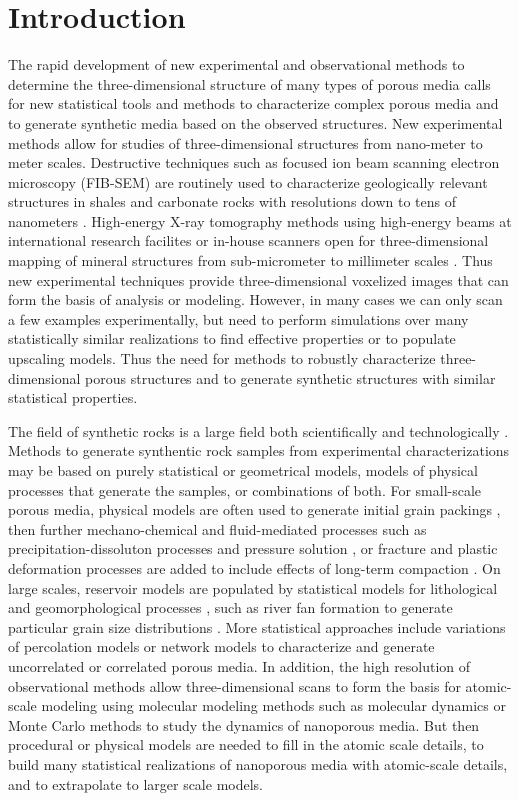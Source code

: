 \documentclass[aps,pre,twocolumn,letterpaper,floatfix,showpacs]{revtex4}
\begin{document}
\section{Introduction}

The rapid development of new experimental and observational methods to determine the three-dimensional structure of many types of porous media calls for new statistical tools and methods to characterize complex porous media and to generate synthetic media based on the observed structures. New experimental methods allow for studies of three-dimensional structures from nano-meter to meter scales. Destructive techniques such as focused ion beam scanning electron microscopy (FIB-SEM) are routinely used to characterize geologically relevant structures in shales and carbonate rocks with resolutions down to tens of nanometers \cite{XX}. High-energy X-ray tomography methods using high-energy beams at international research facilites or in-house scanners open for three-dimensional mapping of mineral structures from sub-micrometer to millimeter scales \cite{XX}. Thus new experimental techniques provide three-dimensional voxelized images that can form the basis of analysis or modeling. However, in many cases we can only scan a few examples experimentally, but need to perform simulations over many statistically similar realizations to find effective properties or to populate upscaling models. Thus the need for methods to robustly characterize three-dimensional porous structures and to generate synthetic structures with similar statistical properties. 

The field of synthetic rocks is a large field both scientifically and technologically \cite{}. Methods to generate synthentic rock samples from experimental characterizations may be based on purely statistical or geometrical models, models of physical processes that generate the samples, or combinations of both. For small-scale porous media, physical models are often used to generate initial grain packings \cite{}, then further mechano-chemical and fluid-mediated processes such as precipitation-dissoluton processes and pressure solution \cite{}, or fracture and plastic deformation processes are added to include effects of long-term compaction \cite{}. On large scales, reservoir models are populated by statistical models for lithological and geomorphological processes \cite{}, such as river fan formation to generate particular grain size distributions \cite{}. More statistical approaches include variations of percolation models \cite{sahimi} or network models \cite{} to characterize and generate uncorrelated or correlated porous media. In addition, the high resolution of observational methods allow three-dimensional scans to form the basis for atomic-scale modeling using molecular modeling methods such as molecular dynamics or Monte Carlo methods to study the dynamics of nanoporous media. But then procedural or physical models are needed to fill in the atomic scale details, to build many statistical realizations of nanoporous media with atomic-scale details, and to extrapolate to larger scale models.
\end{document}

